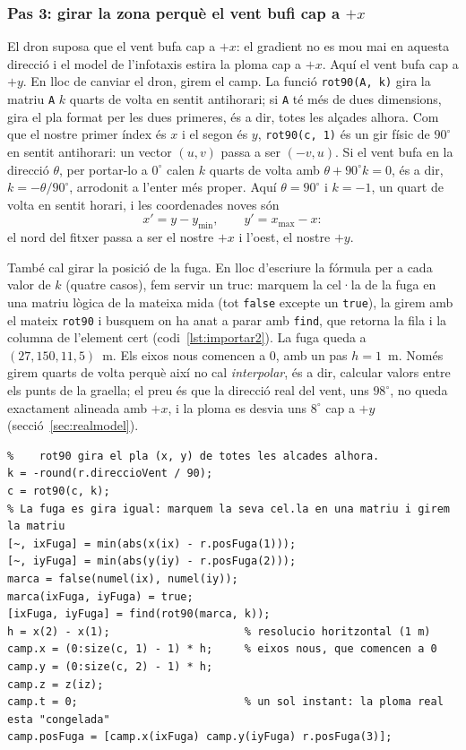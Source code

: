 \documentclass[11pt,a4paper]{article}
\begin{document}
\subsubsection*{Pas 3: girar la zona perquè el vent bufi cap a $+x$}

El dron suposa que el vent bufa cap a $+x$: el gradient no es mou mai en aquesta direcció i el model de l'infotaxis estira la ploma cap a $+x$. Aquí el vent bufa cap a $+y$. En lloc de canviar el dron, girem el camp. La funció \texttt{rot90(A, k)} gira la matriu \texttt{A} $k$ quarts de volta en sentit antihorari; si \texttt{A} té més de dues dimensions, gira el pla format per les dues primeres, és a dir, totes les alçades alhora. Com que el nostre primer índex és $x$ i el segon és $y$, \texttt{rot90(c, 1)} és un gir físic de $90^\circ$ en sentit antihorari: un vector $(u, v)$ passa a ser $(-v, u)$. Si el vent bufa en la direcció $\theta$, per portar-lo a $0^\circ$ calen $k$ quarts de volta amb $\theta + 90^\circ k = 0$, és a dir, $k = -\theta/90^\circ$, arrodonit a l'enter més proper. Aquí $\theta = 90^\circ$ i $k = -1$, un quart de volta en sentit horari, i les coordenades noves són
\begin{equation}
x' = y - y_{\min}, \qquad y' = x_{\max} - x:
\end{equation}
el nord del fitxer passa a ser el nostre $+x$ i l'oest, el nostre $+y$.

També cal girar la posició de la fuga. En lloc d'escriure la fórmula per a cada valor de $k$ (quatre casos), fem servir un truc: marquem la cel·la de la fuga en una matriu lògica de la mateixa mida (tot \texttt{false} excepte un \texttt{true}), la girem amb el mateix \texttt{rot90} i busquem on ha anat a parar amb \texttt{find}, que retorna la fila i la columna de l'element cert (codi~\ref{lst:importar2}). La fuga queda a $(27, 150, 11{,}5)$~m. Els eixos nous comencen a 0, amb un pas $h = 1$~m. Només girem quarts de volta perquè així no cal \emph{interpolar}, és a dir, calcular valors entre els punts de la graella; el preu és que la direcció real del vent, uns $98^\circ$, no queda exactament alineada amb $+x$, i la ploma es desvia uns $8^\circ$ cap a $+y$ (secció~\ref{sec:realmodel}).

\begin{lstlisting}[caption={Pas 3 de \texttt{Ploma.importarPalm}: gir.}, label=lst:importar2]
% 3. Gir de k quarts de volta (k > 0: sentit antihorari) fins que el vent va cap a +x.
%    rot90 gira el pla (x, y) de totes les alcades alhora.
k = -round(r.direccioVent / 90);
c = rot90(c, k);
% La fuga es gira igual: marquem la seva cel.la en una matriu i girem la matriu
[~, ixFuga] = min(abs(x(ix) - r.posFuga(1)));
[~, iyFuga] = min(abs(y(iy) - r.posFuga(2)));
marca = false(numel(ix), numel(iy));
marca(ixFuga, iyFuga) = true;
[ixFuga, iyFuga] = find(rot90(marca, k));
h = x(2) - x(1);                     % resolucio horitzontal (1 m)
camp.x = (0:size(c, 1) - 1) * h;     % eixos nous, que comencen a 0
camp.y = (0:size(c, 2) - 1) * h;
camp.z = z(iz);
camp.t = 0;                          % un sol instant: la ploma real esta "congelada"
camp.posFuga = [camp.x(ixFuga) camp.y(iyFuga) r.posFuga(3)];
\end{lstlisting}
\end{document}
